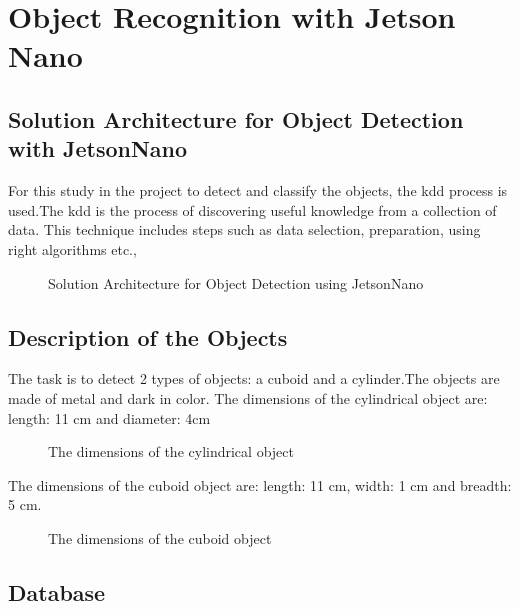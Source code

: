 %
%

\chapter{Object Recognition with Jetson Nano} 

\section{Solution Architecture for Object Detection with JetsonNano}
For this study in the project to detect and classify the objects, the \ac{kdd} process is used.The \ac{kdd} is the process of discovering useful knowledge from a collection of data. This technique includes steps such as data selection, preparation, using right algorithms etc.,
\begin{figure}[H]
	\centering
	
	
	\caption{Solution Architecture for Object Detection using JetsonNano}
\end{figure} 

\section{Description of the Objects}

The task is to detect 2 types of objects: a cuboid and a cylinder.The objects are made of metal and dark in color.
The dimensions of the cylindrical object are: length: 11 cm and diameter: 4cm
\begin{figure}[H]
	\centering
	
	
	\caption{The dimensions of the cylindrical object}
\end{figure} 
The dimensions of the cuboid object are: length: 11 cm, width: 1 cm and breadth: 5 cm.
\begin{figure}[H]
	\centering
	
	
	\caption{The dimensions of the cuboid object}
\end{figure} 

\section{Database}

